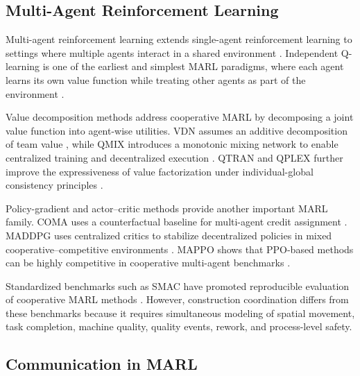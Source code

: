 \documentclass[preprint,12pt]{elsarticle}
\begin{document}
\subsection{Multi-Agent Reinforcement Learning}

Multi-agent reinforcement learning extends single-agent reinforcement learning to settings where multiple agents interact in a shared environment \cite{SuttonBarto2018RL,Tan1993MARL}. Independent Q-learning is one of the earliest and simplest MARL paradigms, where each agent learns its own value function while treating other agents as part of the environment \cite{Tan1993MARL}.

Value decomposition methods address cooperative MARL by decomposing a joint value function into agent-wise utilities. VDN assumes an additive decomposition of team value \cite{Sunehag2018VDN}, while QMIX introduces a monotonic mixing network to enable centralized training and decentralized execution \cite{Rashid2018QMIX}. QTRAN and QPLEX further improve the expressiveness of value factorization under individual-global consistency principles \cite{Son2019QTRAN,Wang2021QPLEX}.

Policy-gradient and actor--critic methods provide another important MARL family. COMA uses a counterfactual baseline for multi-agent credit assignment \cite{Foerster2018COMA}. MADDPG uses centralized critics to stabilize decentralized policies in mixed cooperative--competitive environments \cite{Lowe2017MADDPG}. MAPPO shows that PPO-based methods can be highly competitive in cooperative multi-agent benchmarks \cite{Schulman2017PPO,Yu2022MAPPO}.

Standardized benchmarks such as SMAC have promoted reproducible evaluation of cooperative MARL methods \cite{Samvelyan2019SMAC}. However, construction coordination differs from these benchmarks because it requires simultaneous modeling of spatial movement, task completion, machine quality, quality events, rework, and process-level safety.

\subsection{Communication in MARL}
\end{document}
